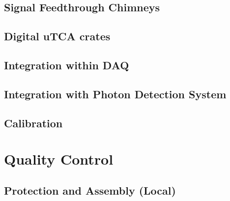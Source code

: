 \subsection{Signal Feedthrough Chimneys}
\label{sec:fddp-tpc-elec-install-sft}

\subsection{Digital uTCA crates}
\label{sec:fddp-tpc-elec-install-utca}



\subsection{Integration within DAQ}
\label{sec:fddp-tpc-elec-install-daq}

\subsection{Integration with Photon Detection System}
\label{sec:fddp-tpc-elec-install-pmt}

\subsection{Calibration}
\label{sec:fddp-tpc-elec-install-calib}

\section{Quality Control}
\label{sec:fddp-tpc-elec-qc}

\subsection{Protection and Assembly (Local)}
\label{sec:fddp-tpc-elec-qc-local}


